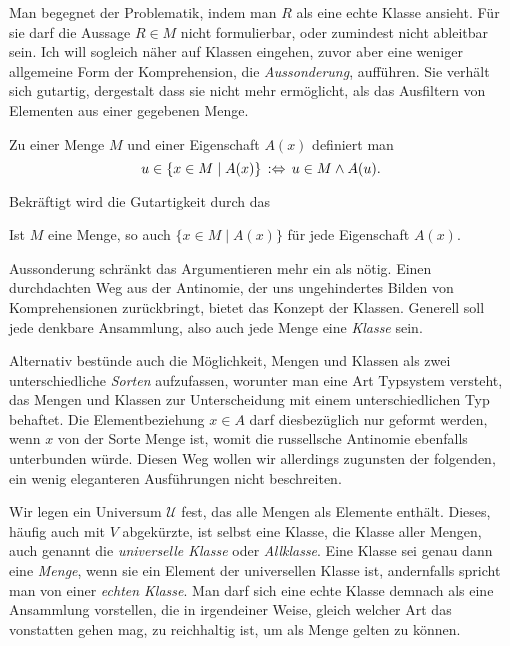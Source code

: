 Man begegnet der Problematik, indem man $R$ als eine echte
Klasse ansieht. Für sie darf die Aussage $R\in M$ nicht formulierbar, oder
zumindest nicht ableitbar sein. Ich will sogleich näher auf
Klassen eingehen, zuvor aber eine weniger allgemeine Form der Komprehension,
die \emph{Aussonderung}, aufführen. Sie verhält sich
gutartig, dergestalt dass sie nicht mehr ermöglicht, als das Ausfiltern
von Elementen aus einer gegebenen Menge.

\begin{Definition}[Aussonderung]%
\label{def:Aussonderung}\newlinefirst
Zu einer Menge $M$ und einer Eigenschaft $A(x)$ definiert man
\[u\in\{x\in M\mid A(x)\}\,:\Leftrightarrow\, u\in M\land A(u).\]
\end{Definition}

\noindent
Bekräftigt wird die Gutartigkeit durch das

\begin{Axiom}\newlinefirst
Ist $M$ eine Menge, so auch $\{x\in M\mid A(x)\}$ für jede Eigenschaft $A(x)$.
\end{Axiom}

\noindent
Aussonderung schränkt das Argumentieren mehr ein als nötig. Einen
durchdachten Weg aus der Antinomie, der uns ungehindertes Bilden von
Komprehensionen zurückbringt, bietet das Konzept der Klassen.
Generell soll jede denkbare Ansammlung, also auch jede Menge eine
\emph{Klasse} sein.

Alternativ bestünde auch die Möglichkeit, Mengen und Klassen als zwei
unterschiedliche \emph{Sorten} aufzufassen, worunter man eine Art
Typsystem versteht, das Mengen und Klassen zur Unterscheidung mit einem
unterschiedlichen Typ behaftet. Die Elementbeziehung $x \in A$
darf diesbezüglich nur geformt werden, wenn $x$ von der Sorte Menge ist,
womit die russellsche Antinomie ebenfalls unterbunden würde. Diesen Weg
wollen wir allerdings zugunsten der folgenden, ein wenig eleganteren
Ausführungen nicht beschreiten.

Wir legen ein Universum $\mathcal U$ fest, das alle Mengen als Elemente
enthält. Dieses, häufig auch mit $V$ abgekürzte, ist selbst
eine Klasse, die Klasse aller Mengen, auch genannt die \emph{universelle
Klasse} oder \emph{Allklasse}. Eine Klasse sei genau dann eine
\emph{Menge}, wenn sie ein Element der universellen Klasse ist,
andernfalls spricht man von einer \emph{echten Klasse}. Man darf sich
eine echte Klasse demnach als eine Ansammlung vorstellen, die in
irgendeiner Weise, gleich welcher Art das vonstatten gehen mag, zu
reichhaltig ist, um als Menge gelten zu können.


